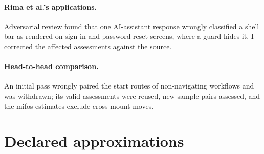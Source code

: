 \paragraph{Rima et al.'s applications.} Adversarial review found that one AI-assistant response wrongly classified a
shell bar as rendered on sign-in and password-reset screens, where a guard hides it. I corrected the
affected assessments against the source.

\paragraph{Head-to-head comparison.} An initial pass wrongly paired the start routes of
non-navigating workflows and was withdrawn; its valid assessments were reused, new sample pairs
assessed, and the mifos estimates exclude cross-mount moves.

\clearpage
\section{Declared approximations}
\label{app:approx}

